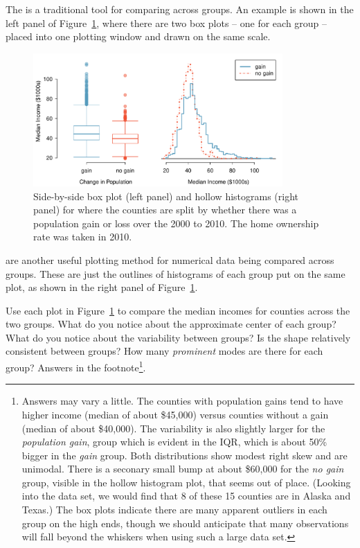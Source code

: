 The  is a traditional tool for comparing across groups. An example is shown in the left panel of Figure~\ref{countyIncomeSplitByPopGain}, where there are two box plots -- one for each group -- placed into one plotting window and drawn on the same scale.
\begin{figure}
   \centering
   \includegraphics[width=0.85\textwidth]{01/figures/countyIncomeSplitByPopGain/countyIncomeSplitByPopGain}
   \caption{Side-by-side box plot (left panel) and hollow histograms (right panel) for  where the counties are split by whether there was a population gain or loss over the 2000 to 2010. The home ownership rate was taken in 2010.}
   \label{countyIncomeSplitByPopGain}
\end{figure}

 are another useful plotting method for numerical data being compared across groups. These are just the outlines of histograms of each group put on the same plot, as shown in the right panel of Figure~\ref{countyIncomeSplitByPopGain}.

\begin{exercise} \label{comparingPriceByTypeExercise}
Use each plot in Figure~\ref{countyIncomeSplitByPopGain} to compare the median incomes for counties across the two groups. What do you notice about the approximate center of each group? What do you notice about the variability between groups? Is the shape relatively consistent between groups? How many \emph{prominent} modes are there for each group? Answers in the footnote\footnote{Answers may vary a little. The counties with population gains tend to have higher income (median of about \$45,000) versus counties without a gain (median of about \$40,000). The variability is also slightly larger for the \emph{population gain}, group which is evident in the IQR, which is about 50\% bigger in the \emph{gain} group. Both distributions show modest right skew and are unimodal. There is a seconary small bump at about \$60,000 for the \emph{no gain} group, visible in the hollow histogram plot, that seems out of place. (Looking into the data set, we would find that 8 of these 15 counties are in Alaska and Texas.) The box plots indicate there are many apparent outliers in each group on the high ends, though we should anticipate that many observations will fall beyond the whiskers when using such a large data set.}.
\end{exercise}

